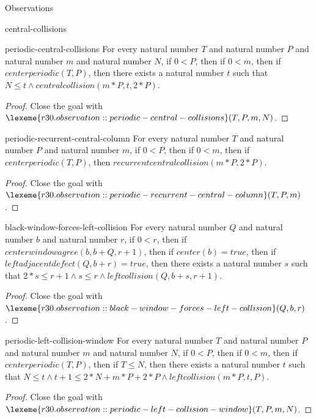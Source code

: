 \begin{lexlean}{Observations}
\begin{section}{central-collisions}
\begin{theorem}{periodic-central-collisions}
For every natural number \(T\) and natural number \(P\) and natural number \(m\) and natural number \(N\), if \(0 < P\), then if \(0 < m\), then if \(centerperiodic(T, P)\), then there exists a natural number \(t\) such that \(N ≤ t ∧ centralcollision(m * P, t, 2 * P)\).
\begin{proof}
Close the goal with \(\lexeme{r30.observation::periodic-central-collisions}(T, P, m, N)\).
\end{proof}
\end{theorem}

\begin{theorem}{periodic-recurrent-central-column}
For every natural number \(T\) and natural number \(P\) and natural number \(m\), if \(0 < P\), then if \(0 < m\), then if \(centerperiodic(T, P)\), then \(recurrentcentralcollision(m * P, 2 * P)\).
\begin{proof}
Close the goal with \(\lexeme{r30.observation::periodic-recurrent-central-column}(T, P, m)\).
\end{proof}
\end{theorem}

\begin{theorem}{black-window-forces-left-collision}
For every natural number \(Q\) and natural number \(b\) and natural number \(r\), if \(0 < r\), then if \(centerwindowagree(b, b + Q, r + 1)\), then if \(center(b) = true\), then if \(leftadjacentdefect(Q, b + r) = true\), then there exists a natural number \(s\) such that \(2 * s ≤ r + 1 ∧ s ≤ r ∧ leftcollision(Q, b + s, r + 1)\).
\begin{proof}
Close the goal with \(\lexeme{r30.observation::black-window-forces-left-collision}(Q, b, r)\).
\end{proof}
\end{theorem}

\begin{theorem}{periodic-left-collision-window}
For every natural number \(T\) and natural number \(P\) and natural number \(m\) and natural number \(N\), if \(0 < P\), then if \(0 < m\), then if \(centerperiodic(T, P)\), then if \(T ≤ N\), then there exists a natural number \(t\) such that \(N ≤ t ∧ t + 1 ≤ 2 * N + m * P + 2 * P ∧ leftcollision(m * P, t, P)\).
\begin{proof}
Close the goal with \(\lexeme{r30.observation::periodic-left-collision-window}(T, P, m, N)\).
\end{proof}
\end{theorem}


\end{section}
\end{lexlean}
